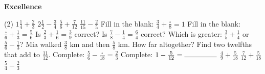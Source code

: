 \documentclass[17pt,a4paper,landscape]{extarticle}
\begin{document}
\sffamily
\boldmath

\boldmath

{\LARGE \textbf{Excellence}}
\begin{tasks}(2)
\task \mbox{$1\frac{1}{4}+\frac{2}{3}$}
\task \mbox{$2\frac{1}{2}-\frac{3}{4}$}
\task \mbox{$\frac{5}{6}+\frac{7}{12}$}
\task \mbox{$\frac{11}{15}-\frac{2}{5}$}
\task Fill in the blank: \mbox{$\frac{3}{4}+\frac{\square}{8}=1$}
\task Fill in the blank: \mbox{$\frac{\square}{6}+\frac{1}{3}=\frac{5}{6}$}
\task Is \mbox{$\frac{2}{3}+\frac{1}{6}=\frac{3}{9}$} correct?
\task Is \mbox{$\frac{7}{8}-\frac{1}{4}=\frac{6}{4}$} correct?
\task Which is greater: \mbox{$\frac{3}{5}+\frac{1}{4}$} or \mbox{$\frac{5}{6}-\frac{1}{3}$}?
\task Mia walked \mbox{$\frac{3}{8}$} km and then \mbox{$\frac{5}{8}$} km. How far altogether?
\task Find two twelfths that add to \mbox{$\frac{11}{12}$}.
\task Complete: \mbox{$\frac{5}{6}-\frac{\square}{18}=\frac{2}{3}$}
\task Complete: \mbox{$1-\frac{5}{12}=\rule{1.6cm}{0.15mm}$}
\task \mbox{$\frac{4}{9}+\frac{5}{18}$}
\task \mbox{$\frac{7}{12}+\frac{5}{18}$}
\task \mbox{$\frac{5}{4}-\frac{2}{3}$}
\end{tasks}
\end{document}
